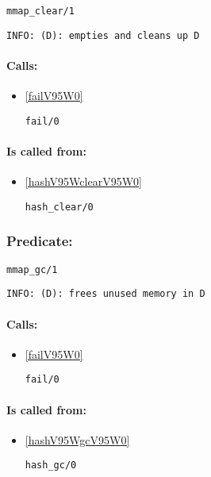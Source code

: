 \begin{verbatim}
mmap_clear/1
\end{verbatim}

{\small \begin{verbatim}
INFO: (D): empties and cleans up D

\end{verbatim}}
\paragraph{Calls:} 
\begin{itemize}
\item \ref{failV95W0} 
\begin{verbatim}
fail/0
\end{verbatim}

\end{itemize}
\paragraph{Is called from:} 
\begin{itemize}
\item \ref{hashV95WclearV95W0} 
\begin{verbatim}
hash_clear/0
\end{verbatim}

\end{itemize}

\subsubsection{Predicate:} \label{mmapV95WgcV95W1}

\begin{verbatim}
mmap_gc/1
\end{verbatim}

{\small \begin{verbatim}
INFO: (D): frees unused memory in D

\end{verbatim}}
\paragraph{Calls:} 
\begin{itemize}
\item \ref{failV95W0} 
\begin{verbatim}
fail/0
\end{verbatim}

\end{itemize}
\paragraph{Is called from:} 
\begin{itemize}
\item \ref{hashV95WgcV95W0} 
\begin{verbatim}
hash_gc/0
\end{verbatim}

\end{itemize}

